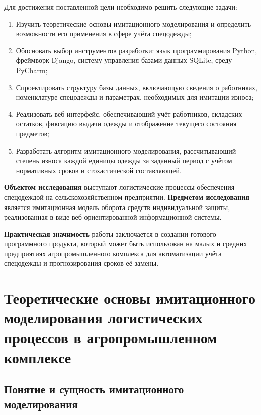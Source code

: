 \documentclass[14pt,a4paper]{extreport}
\begin{document}
\begin{singlespacing}
	Для достижения поставленной цели необходимо решить следующие задачи:
	\begin{enumerate}
		\item Изучить теоретические основы имитационного моделирования и определить возможности его применения в сфере учёта спецодежды;
		\item Обосновать выбор инструментов разработки: язык программирования Python, фреймворк Django, систему управления базами данных SQLite, среду PyCharm;
		\item Спроектировать структуру базы данных, включающую сведения о работниках, номенклатуре спецодежды и параметрах, необходимых для имитации износа;
		\item Реализовать веб-интерфейс, обеспечивающий учёт работников, складских остатков, фиксацию выдачи одежды и отображение текущего состояния предметов;
		\item Разработать алгоритм имитационного моделирования, рассчитывающий степень износа каждой единицы одежды за заданный период с учётом нормативных сроков и стохастической составляющей.
	\end{enumerate}
	
	\textbf{Объектом исследования} выступают логистические процессы обеспечения спецодеждой на сельскохозяйственном предприятии. \textbf{Предметом исследования} является имитационная модель оборота средств индивидуальной защиты, реализованная в виде веб-ориентированной информационной системы.
	
	\textbf{Практическая значимость} работы заключается в создании готового программного продукта, который может быть использован на малых и средних предприятиях агропромышленного комплекса для автоматизации учёта спецодежды и прогнозирования сроков её замены.
	
	\newpage
	
	\chapter[Глава \thechapter. Теоретические основы имитационного моделирования логистических процессов в агропромышленном комплексе]{Теоретические основы имитационного моделирования логистических процессов в агропромышленном комплексе}
	
	\section{Понятие и сущность имитационного моделирования}
	

\end{singlespacing}
\end{document}
